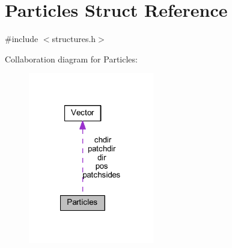 \hypertarget{struct_particles}{\section{Particles Struct Reference}
\label{struct_particles}
}


{\ttfamily \#include $<$structures.\+h$>$}



Collaboration diagram for Particles\+:\nopagebreak
\begin{figure}[H]
\begin{center}
\leavevmode
\includegraphics[width=155pt]{struct_particles__coll__graph}
\end{center}
\end{figure}
